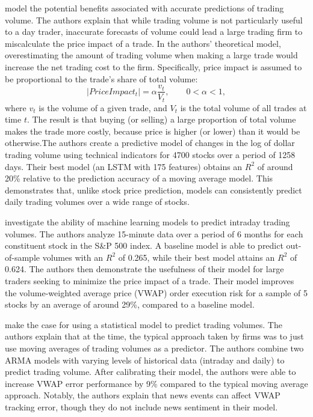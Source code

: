 \documentclass[12pt]{article}
\begin{document}
\textcite{goyenko2024trading} model the potential benefits associated with accurate predictions of trading volume. The authors explain that while trading volume is not particularly useful to a day trader, inaccurate forecasts of volume could lead a large trading firm to miscalculate the price impact of a trade. In the authors' theoretical model, overestimating the amount of trading volume when making a large trade would increase the net trading cost to the firm. Specifically, price impact is assumed to be proportional to the trade's share of total volume:
\begin{equation}
    |Price Impact_{t}| = \alpha\frac{v_{t}}{V_{t}}, \qquad 0< \alpha < 1,
\end{equation}
where $v_{t}$ is the volume of a given trade, and $V_{t}$ is the total volume of all trades at time $t$. The result is that buying (or selling) a large proportion of total volume makes the trade more costly, because price is higher (or lower) than it would be otherwise.The authors create a predictive model of changes in the log of dollar trading volume using technical indicators for 4700 stocks over a period of 1258 days. Their best model (an LSTM with 175 features) obtains an $R^2$ of around 20\% relative to the prediction accuracy of a moving average model. This demonstrates that, unlike stock price prediction, models can consistently predict daily trading volumes over a wide range of stocks.

\textcite{cucuringu2025forecasting} investigate the ability of machine learning models to predict intraday trading volumes. The authors analyze 15-minute data over a period of 6 months for each constituent stock in the S\&P 500 index. A baseline model is able to predict out-of-sample volumes with an $R^2$ of 0.265, while their best model attains an $R^2$ of 0.624. The authors then demonstrate the usefulness of their model for large traders seeking to minimize the price impact of a trade. Their model improves the volume-weighted average price (VWAP) order execution risk for a sample of 5 stocks by an average of around 29\%, compared to a baseline model.

\textcite{satish2014predicting} make the case for using a statistical model to predict trading volumes. The authors explain that at the time,  the typical approach taken by firms was to just use moving averages of trading volumes as a predictor. The authors combine two ARMA models with varying levels of historical data (intraday and daily) to predict trading volume. After calibrating their model, the authors were able to increase VWAP error performance by 9\% compared to the typical moving average approach. Notably, the authors explain that news events can affect VWAP tracking error, though they do not include news sentiment in their model.
\end{document}
